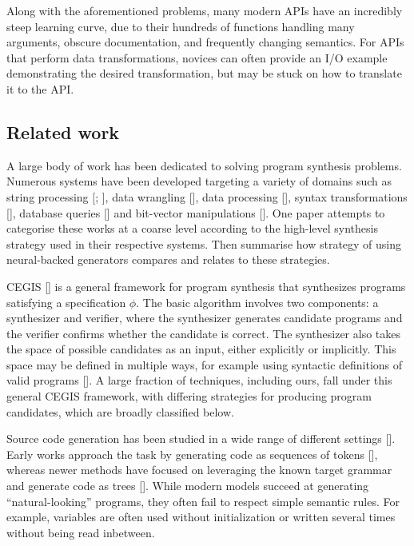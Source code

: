 \documentclass{article}
\begin{document}
Along with the aforementioned problems, many modern APIs have an incredibly steep learning curve, due to their hundreds of functions handling many arguments, obscure documentation, and frequently changing semantics. For APIs that perform data transformations, novices can often provide an I/O example demonstrating the desired transformation, but may be stuck on how to translate it to the API.
\subsection{Related work}
A large body of work has been dedicated to solving program synthesis problems. Numerous systems have been developed targeting a variety of domains such as string processing [\cite{Gulwani2011}; \cite{parisotto2017neuro-symbolic}], data wrangling [\cite{Feng2018}], data processing [\cite{Smith2016}], syntax transformations [\cite{Rolim2017}], database queries [\cite{Yaghmazadeh2017}] and bit-vector manipulations [\cite{Jha2010}]. One paper attempts to categorise these works at a coarse level according to the high-level synthesis strategy used in their respective systems. Then summarise how strategy of using neural-backed generators compares and relates to these strategies.

CEGIS [\cite{SolarLezama2008}] is a general framework for program synthesis that synthesizes programs satisfying a specification $\phi$. The basic algorithm involves two components: a synthesizer and verifier, where the synthesizer generates candidate programs and the verifier confirms whether the candidate is correct. The synthesizer also takes the space of possible candidates as an input, either explicitly or implicitly. This space may be defined in multiple ways, for example using syntactic definitions of valid programs [\cite{Alur2013}]. A large fraction of techniques, including ours, fall under this general CEGIS framework, with differing strategies for producing program candidates, which are broadly classified below.

Source code generation has been studied in a wide range of different settings [\cite{allamanis2018survey}]. Early works approach the task by generating code as sequences of tokens [\cite{hindle2016CACM}], whereas newer methods have focused on leveraging the known target grammar and generate code as trees [\cite{Maddison2014}]. While modern models succeed at generating “natural-looking” programs, they often fail to respect simple semantic rules. For example, variables are often used without initialization or written several times without being read inbetween.
\end{document}
